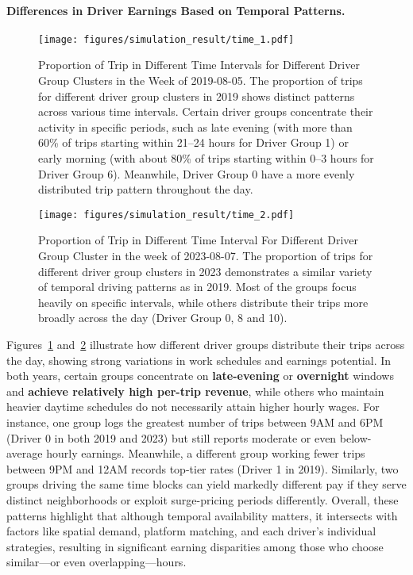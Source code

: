 \paragraph{\textbf{Differences in Driver Earnings Based on Temporal Patterns.}}

\begin{figure}[ht]
  \centering
  \texttt{[image: figures/simulation\_result/time\_1.pdf]}
  \caption{Proportion of Trip in Different Time Intervals for Different Driver Group Clusters in the Week of 2019-08-05. The proportion of trips for different driver group clusters in 2019 shows distinct patterns across various time intervals. Certain driver groups concentrate their activity in specific periods, such as late evening (with more than 60\% of trips starting within 21--24 hours for Driver Group 1) or early morning (with about 80\% of trips starting within 0--3 hours for Driver Group 6). Meanwhile, Driver Group 0 have a more evenly distributed trip pattern throughout the day.
}
  \label{figure:time_chunk_2019}
\end{figure}

\begin{figure}[H]
  \centering
  \texttt{[image: figures/simulation\_result/time\_2.pdf]}
  \caption{Proportion of Trip in Different Time Interval For Different Driver Group Cluster in the week of 2023-08-07. The proportion of trips for different driver group clusters in 2023 demonstrates a similar variety of temporal driving patterns as in 2019. Most of the groups focus heavily on specific intervals, while others distribute their trips more broadly across the day (Driver Group 0, 8 and 10).}

  \label{figure:time_chunk_2023}
\end{figure}



Figures~\ref{figure:time_chunk_2019} and~\ref{figure:time_chunk_2023} illustrate how different driver groups distribute their trips across the day, showing strong variations in work schedules and earnings potential. In both years, certain groups concentrate on \textbf{late-evening} or \textbf{overnight} windows and \textbf{achieve relatively high per-trip revenue}, while others who maintain heavier daytime schedules do not necessarily attain higher hourly wages. For instance, one group logs the greatest number of trips between 9AM and 6PM (Driver 0 in both 2019 and 2023) but still reports moderate or even below-average hourly earnings. Meanwhile, a different group working fewer trips between 9PM and 12AM records top-tier rates (Driver 1 in 2019). Similarly, two groups driving the same time blocks can yield markedly different pay if they serve distinct neighborhoods or exploit surge-pricing periods differently. Overall, these patterns highlight that although temporal availability matters, it intersects with factors like spatial demand, platform matching, and each driver’s individual strategies, resulting in significant earning disparities among those who choose similar—or even overlapping—hours. 

